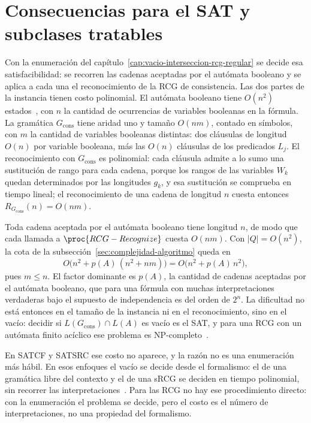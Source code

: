 
\section{Consecuencias para el SAT y subclases tratables}
\label{sec:lectura-sat}

Con la enumeración del capítulo~\ref{cap:vacio-interseccion-rcg-regular}
se decide esa satisfacibilidad: se
recorren las cadenas aceptadas por el autómata booleano y se aplica a
cada una el reconocimiento de la RCG de consistencia. Las dos partes
de la instancia tienen costo polinomial. El autómata booleano tiene
$O(n^2)$ estados~\cite{fernandezarias2007}, con $n$ la cantidad de
ocurrencias de variables booleanas en la fórmula. La gramática
$G_{\mathrm{cons}}$ tiene aridad uno y tamaño $O(nm)$, contado en
símbolos, con $m$ la cantidad de variables booleanas distintas: dos
cláusulas de longitud $O(n)$ por variable booleana, más las $O(n)$
cláusulas de los predicados $L_j$. El reconocimiento con
$G_{\mathrm{cons}}$ es polinomial: cada cláusula admite a lo sumo una sustitución de rango
para cada cadena, porque los rangos de las variables $W_k$ quedan
determinados por las longitudes $g_k$, y esa sustitución se comprueba
en tiempo lineal; el reconocimiento de una cadena de longitud $n$
cuesta entonces $R_{G_{\mathrm{cons}}}(n) = O(nm)$.

Toda cadena aceptada por el autómata booleano tiene longitud $n$, de
modo que cada llamada a $\proc{RCG-Recognize}$ cuesta $O(nm)$. Con
$|Q| = O(n^2)$, la cota de la
subsección~\ref{sec:complejidad-algoritmo} queda en
\[
  O\bigl( n^2 + p(A)\,(n^2 + nm) \bigr) = O\bigl( n^2 + p(A)\,n^2 \bigr),
\]
pues $m \le n$. El factor dominante es $p(A)$, la cantidad de cadenas
aceptadas por el autómata booleano, que para una fórmula con muchas
interpretaciones verdaderas bajo el supuesto de independencia es del
orden de $2^n$. La dificultad no está entonces en el tamaño de la
instancia ni en el reconocimiento, sino en el vacío: decidir si
$L(G_{\mathrm{cons}}) \cap L(A)$ es vacío es el SAT, y para una RCG
con un autómata finito acíclico ese problema es
NP-completo~\cite{bertsch2001rcg}.

En SATCF y SATSRC ese costo no aparece, y la razón no es una enumeración
más hábil. En esos enfoques el vacío se decide desde el formalismo: el
de una gramática libre del contexto y el de una sRCG se deciden en
tiempo polinomial, sin recorrer las
interpretaciones~\cite{fernandezarias2007,aguileralopez2016}. Para las
RCG no hay ese procedimiento directo: con la enumeración el problema se
decide, pero el costo es el número de interpretaciones, no una propiedad
del formalismo.

